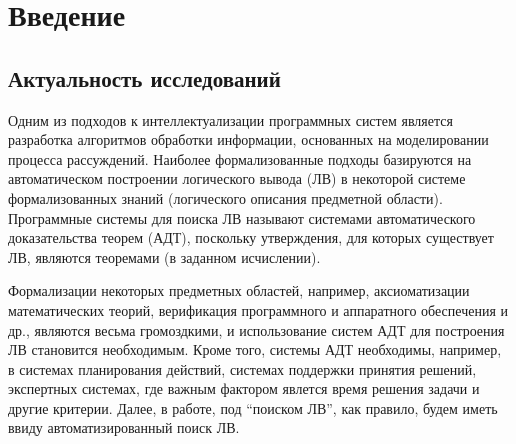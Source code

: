 \chapter*{Введение}

\section*{Актуальность исследований}

Одним из подходов к интеллектуализации программных систем является разработка алгоритмов обработки информации, основанных на моделировании процесса рассуждений. Наиболее формализованные подходы базируются на автоматическом построении логического вывода (ЛВ) в некоторой системе формализованных знаний (логического описания предметной области). Программные системы для поиска ЛВ называют системами автоматического доказательства теорем (АДТ), поскольку утверждения, для которых существует ЛВ, являются теоремами (в заданном исчислении).

Формализации некоторых предметных областей, например, аксиоматизации математических теорий, верификация программного и аппаратного обеспечения и др., являются весьма громоздкими, и использование систем АДТ для построения ЛВ становится необходимым. Кроме того, системы АДТ необходимы, например, в системах планирования действий, системах поддержки принятия решений, экспертных системах, где важным фактором явлется время решения задачи и другие критерии. Далее, в работе, под ``поиском ЛВ'', как правило, будем иметь ввиду автоматизированный поиск ЛВ.

